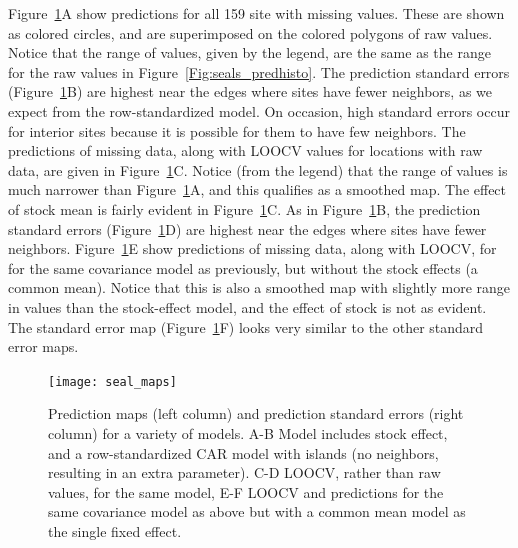 \documentclass[12pt, titlepage]{article}
\begin{document}
Figure~\ref{Fig:seal_maps}A show predictions for all 159 site with missing values.  These are shown as colored circles, and are superimposed on the colored polygons of raw values. Notice that the range of values, given by the legend, are the same as the range for the raw values in Figure~\ref{Fig:seals_predhisto}.  The prediction standard errors (Figure~\ref{Fig:seal_maps}B) are highest near the edges where sites have fewer neighbors, as we expect from the row-standardized model.  On occasion, high standard errors occur for interior sites because it is possible for them to have few neighbors.  The predictions of missing data, along with LOOCV values for locations with raw data, are given in Figure~\ref{Fig:seal_maps}C.  Notice (from the legend) that the range of values is much narrower than Figure~\ref{Fig:seal_maps}A, and this qualifies as a smoothed map.  The effect of stock mean is fairly evident in Figure~\ref{Fig:seal_maps}C. As in Figure~\ref{Fig:seal_maps}B, the prediction standard errors (Figure~\ref{Fig:seal_maps}D) are highest near the edges where sites have fewer neighbors. Figure~\ref{Fig:seal_maps}E show predictions of missing data, along with LOOCV, for for the same covariance model as previously, but without the stock effects (a common mean).  Notice that this is also a smoothed map with slightly more range in values than the stock-effect model, and the effect of stock is not as evident.  The standard error map (Figure~\ref{Fig:seal_maps}F) looks very similar to the other standard error maps.

\begin{figure}[H]
  \begin{center}
	    \texttt{[image: seal\_maps]}
  \end{center}
  \caption{Prediction maps (left column) and prediction standard errors (right column) for a variety of models. A-B Model includes stock effect, and a row-standardized CAR model with islands (no neighbors, resulting in an extra parameter). C-D LOOCV, rather than raw values, for the same model, E-F LOOCV and predictions for the same covariance model as above but with a common mean model as the single fixed effect. \label{Fig:seal_maps}}
\end{figure}


%


%
%
\end{document}
